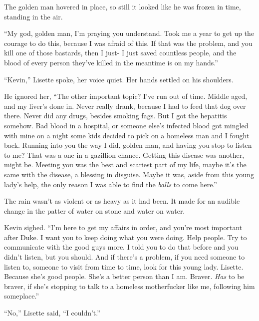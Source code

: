 The golden man hovered in place, so still it looked like he was frozen in time, standing in the air.



``My god, golden man, I'm praying you understand.  Took me a year to get up the courage to do this, because I was afraid of this.  If that was the problem, and you kill one of those bastards, then I just- I just saved countless people, and the blood of every person they've killed in the meantime is on my hands.''



``Kevin,'' Lisette spoke, her voice quiet.  Her hands settled on his shoulders.



He ignored her, ``The other important topic?  I've run out of time.  Middle aged, and my liver's done in.  Never really drank, because I had to feed that dog over there.  Never did any drugs, besides smoking fags.  But I got the hepatitis somehow.  Bad blood in a hospital, or someone else's infected blood got mingled with mine on a night some kids decided to pick on a homeless man and I fought back.  Running into you the way I did, golden man, and having you stop to listen to me?  That was a one in a gazillion chance.  Getting this disease was another, might be.  Meeting you was the best and scariest part of my life, maybe it's the same with the disease, a blessing in disguise.  Maybe it was, aside from this young lady's help, the only reason I was able to find the \emph{balls} to come here.''



The rain wasn't as violent or as heavy as it had been.  It made for an audible change in the patter of water on stone and water on water.



Kevin sighed.  ``I'm here to get my affairs in order, and you're most important after Duke.  I want you to keep doing what you were doing.  Help people.  Try to communicate with the good guys more.  I told you to do that before and you didn't listen, but you should.  And if there's a problem, if you need someone to listen to, someone to visit from time to time, look for this young lady.  Lisette.  Because she's good people.  She's a better person than I am.  Braver.  \emph{Has} to be braver, if she's stopping to talk to a homeless motherfucker like me, following him someplace.''



``No,'' Lisette said, ``I couldn't.''



